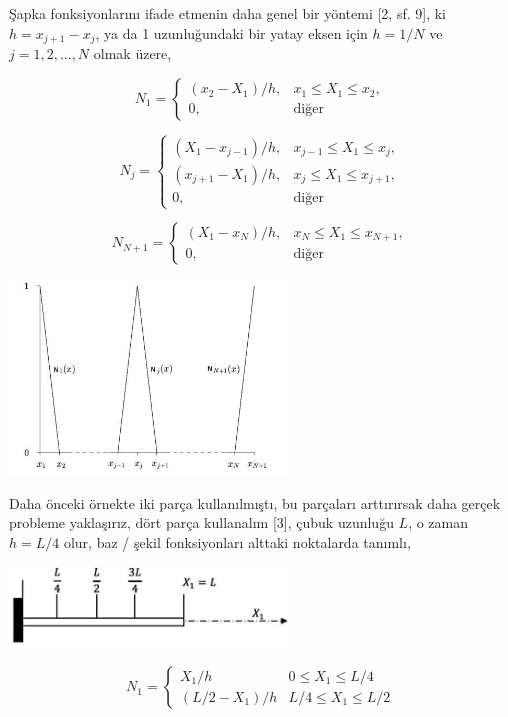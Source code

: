 \documentclass[12pt,fleqn]{article}\usepackage{../../common}
\begin{document}
Şapka fonksiyonlarını ifade etmenin daha genel bir yöntemi [2, sf. 9], ki $h =
x_{j+1}-x_j$, ya da 1 uzunluğundaki bir yatay eksen için $h = 1/N$ ve $j =
1,2,...,N$ olmak üzere,

$$
N_1 = \left\{ \begin{array}{rr}
(x_2 - X_1)/h, & x_1 \le X_1 \le x_2,\\
0, & \textrm{diğer}
\end{array} \right.
$$

$$
N_j = \left\{ \begin{array}{rr}
(X_1 - x_{j-1})/h, & x_{j-1} \le X_1 \le x_j,\\
(x_{j+1} - X_1)/h, & x_j \le X_1 \le x_{j+1},\\
0, & \textrm{diğer}
\end{array} \right.
$$

$$
N_{N+1} = \left\{ \begin{array}{rr}
(X_1 - x_N)/h, & x_N \le X_1 \le x_{N+1},\\
0, & \textrm{diğer}
\end{array} \right.
$$

\includegraphics[width=20em]{compscieng_bpp45fem2_09.jpg}

Daha önceki örnekte iki parça kullanılmıştı, bu parçaları arttırırsak daha
gerçek probleme yaklaşırız, dört parça kullanalım [3], çubuk uzunluğu $L$,
o zaman $h = L/4$ olur, baz / şekil fonksiyonları alttaki noktalarda tanımlı,

\includegraphics[width=20em]{compscieng_bpp45fem2_10.jpg}

$$
N_1 = \left\{ \begin{array}{rr}
X_1 / h & 0 \le X_1 \le L/4 \\
(L/2 - X_1) / h & L/4 \le X_1 \le L/2
\end{array} \right.
$$
\end{document}
